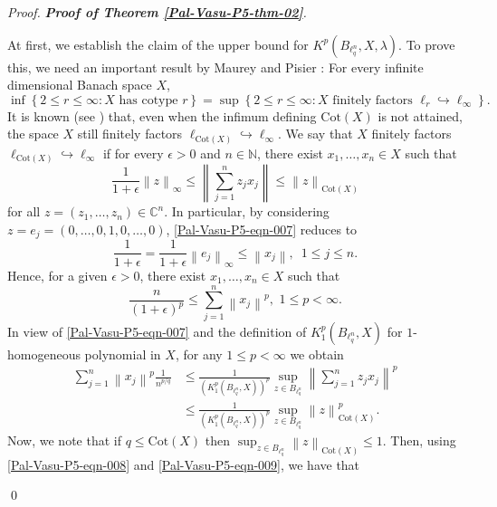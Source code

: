 \documentclass[a4paper,12pt]{amsart}
\theoremstyle{definition}
\newcounter {own}
\newenvironment{pf}[1][]{%
 \vskip 3mm
 \noindent
 \ifthenelse{\equal{#1}{}}%
  {{\slshape Proof. }}%
  {{\slshape #1.} }%
 }%
{\qed\bigskip}
\newcommand{\norm}[1]{\left\lVert#1\right\rVert}
\begin{document}
\begin{pf}[{\bf Proof of Theorem \ref{Pal-Vasu-P5-thm-02}}]
	At first, we establish the claim of the upper bound for $ K^p(B_{\ell^n_q},X,\lambda)$. To prove this, we need an important result by Maurey and Pisier \cite[Theorem 14.5]{diestel-Abs-sum-book}: For every infinite dimensional Banach space $X$,
	\begin{equation*}
		\inf \left\{2\leq r\leq \infty : X \,\, \mbox{has cotype}\,\, r \right\}=\sup \left\{2\leq r\leq \infty : X \,\,\mbox{finitely factors}\,\, \ell_r \hookrightarrow \ell_{\infty}\right\}.
	\end{equation*}
It is known (see \cite{diestel-Abs-sum-book}) that, even when the infimum defining  $\mathrm{Cot}(X)$ is not attained, the space $X$ still finitely factors $\ell_{\mathrm{Cot}(X)} \hookrightarrow \ell_{\infty}$.	We say that $X$ finitely factors $\ell_{\text{Cot}(X)} \hookrightarrow \ell_{\infty}$ if for every $\epsilon>0$ and $n\in \mathbb{N}$, there exist $x_1, \ldots, x_n\in X$ such that 
	\begin{equation}\label{Pal-Vasu-P5-eqn-007}
		\frac{1}{1+\epsilon}\norm{z}_{\infty}\leq \norm{\sum_{j=1}^{n}z_jx_j}\leq \norm{z}_{\text{Cot}(X)}
	\end{equation}
for all $z=(z_1, \ldots, z_n)\in \mathbb{C}^n$. In particular, by considering $z=e_j=(0,\ldots, 0,1,0,\ldots,0)$, \eqref{Pal-Vasu-P5-eqn-007} reduces to
\begin{equation*}
	\frac{1}{1+\epsilon}=\frac{1}{1+\epsilon}\norm{e_j}_{\infty}\leq \norm{x_j},\,\,\, 1\leq j\leq n.
\end{equation*}
Hence, for a given $\epsilon>0$, there exist $x_1, \ldots, x_n\in X$ such that 
\begin{equation}\label{Pal-Vasu-P5-eqn-008}
	\frac{n}{(1+\epsilon)^p}\leq \sum_{j=1}^{n}\norm{x_j}^p,\,\, 1\leq p<\infty.
\end{equation}
In view of \eqref{Pal-Vasu-P5-eqn-007} and the definition of $K^p_{1}(B_{\ell^n_q},X)$ for $1$-homogeneous polynomial in $X$, for any $1\leq p<\infty$ we obtain
\begin{align}\label{Pal-Vasu-P5-eqn-009}
	\sum_{j=1}^{n}\norm{x_j}^p\frac{1}{n^{p/q}} \nonumber &\leq \frac{1}{\left(K^p_{1}(B_{\ell^n_q},X)\right)^p}\sup_{z\in B_{\ell^n_{q}}}\norm{\sum_{j=1}^{n}z_jx_j}^p \\[2mm] &\leq \frac{1}{\left(K^p_{1}(B_{\ell^n_q},X)\right)^p}\sup_{z\in B_{\ell^n_{q}}}\norm{z}^p_{\text{Cot}(X)}.
\end{align}
Now, we note that if $q\leq \text{Cot}(X)$ then $\sup_{z\in B_{\ell^n_{q}}}\norm{z}_{\text{Cot}(X)}\leq 1$. Then, using \eqref{Pal-Vasu-P5-eqn-008} and \eqref{Pal-Vasu-P5-eqn-009}, we have that

\end{pf}
\end{document}
